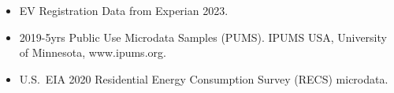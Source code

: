 \begin{itemize}
\item EV Registration Data from Experian 2023.
\item 2019-5yrs Public Use Microdata Samples (PUMS). IPUMS USA, University of Minnesota, www.ipums.org.
\item U.S.~EIA 2020 Residential Energy Consumption Survey (RECS) microdata.
\end{itemize}
